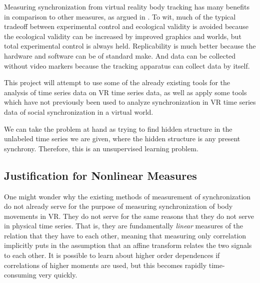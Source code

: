 \documentclass[12pt]{article}
\begin{document}
Measuring synchronization from virtual reality body tracking has many benefits in comparison to other measures, as argued in \cite{blascovich}. To wit, much of the typical tradeoff between experimental control and ecological validity is avoided because the ecological validity can be increased by improved graphics and worlds, but total experimental control is always held. Replicability is much better because the hardware and software can be of standard make. And data can be collected without video markers because the tracking apparatus can collect data by itself. \cite{blascovich}

This project will attempt to use some of the already existing tools for the analysis of time series data on VR time series data, as well as apply some tools which have not previously been used to analyze synchronization in VR time series data of social synchronization in a virtual world.

We can take the problem at hand as trying to find hidden structure in the unlabeled time series we are given, where the hidden structure is any present synchrony. Therefore, this is an unsupervised learning problem. %

\subsection{Justification for Nonlinear Measures}

One might wonder why the existing methods of measurement of synchronization do not already serve for the purpose of measuring synchronization of body movements in VR. They do not serve for the same reasons that they do not serve in physical time series. That is, they are fundamentally \emph{linear} measures of the relation that they have to each other, meaning that measuring only correlation implicitly puts in the assumption that an affine transform relates the two signals to each other. It is possible to learn about higher order dependences if correlations of higher moments are used, but this becomes rapidly time-consuming very quickly\cite{pompe}.
\end{document}
